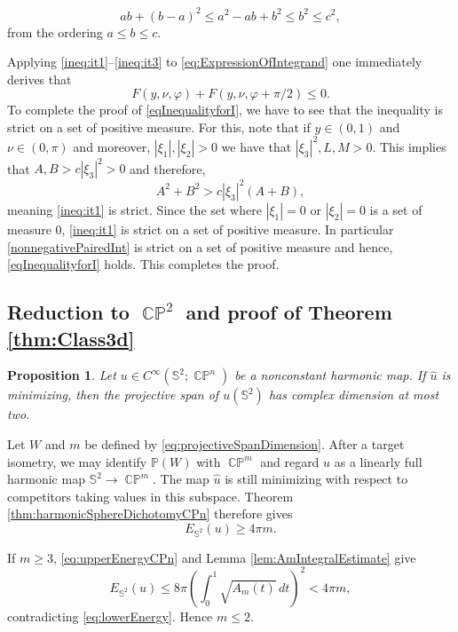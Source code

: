 \documentclass[11pt]{article}
\theoremstyle{plain}
\numberwithin{equation}{section}
\newtheorem{proposition}[theorem]{Proposition}
\theoremstyle{definition}
\let\oldendproof\endproof
\renewenvironment{proof}[1][\proofname]{%
\oldproof[\upshape \bfseries #1]%
}{\oldendproof}
\def \mb{\mathbb}
\DeclareMathOperator{\CP}{\mathbb{CP}}
\begin{document}
\begin{proof}
\begin{enumerate}
        \[
        ab+(b-a)^2\leq a^2-ab+b^2\leq b^2\leq c^2,
        \]
        from the ordering $a\leq b\leq c$.
    \end{enumerate}
    Applying \ref{ineq:it1}--\ref{ineq:it3} to \eqref{eq:ExpressionOfIntegrand} one immediately derives that
    \begin{equation}
        \label{nonnegativePairedInt}F(y,\nu,\varphi)+F(y,\nu,\varphi+\pi/2)\leq 0.
    \end{equation}
    To complete the proof of \eqref{eqInequalityforI}, we have to see that the inequality is strict on a set of positive measure. For this, note that if $y \in (0,1)$ and $\nu \in (0,\pi)$ and moreover, $|\xi_1|,|\xi_2|>0$ we have that $|\xi_3|^2,L,M>0$. This implies that $A,B>c|\xi_3|^2>0$ and therefore,
    \[
    A^2+B^2> c|\xi_3|^2(A+B),
    \]
    meaning \ref{ineq:it1} is strict. Since the set where $|\xi_1|=0$ or $|\xi_2|=0$ is a set of measure $0$, \ref{ineq:it1} is strict on a set of positive measure. In particular \eqref{nonnegativePairedInt} is strict on a set of positive measure and hence, \eqref{eqInequalityforI} holds. This completes the proof.
\end{proof}

\subsection{Reduction to \texorpdfstring{$\CP^2$}{CP2} and proof of
Theorem \ref{thm:Class3d}}

\begin{proposition}
    \label{prop:CP2Reduction}
Let $u\in C^\infty(\mb S^2;\CP^n)$ be a nonconstant harmonic map.  If
$\hat u$ is minimizing, then the projective span of $u(\mb S^2)$ has
complex dimension at most two.
\end{proposition}

\begin{proof}
Let $W$ and $m$ be defined by \eqref{eq:projectiveSpanDimension}.  
After a target isometry, we may identify $\mb P(W)$ with $\CP^m$ and regard
$u$ as a linearly full harmonic map $\mb S^2\to\CP^m$.  The map $\hat u$
is still minimizing with respect to competitors taking values in this
subspace.  Theorem \ref{thm:harmonicSphereDichotomyCPn} therefore gives
\begin{equation}
\label{eq:lowerEnergy}
E_{\mb S^2}(u)\geq 4\pi m.
\end{equation}

If $m\geq3$, \eqref{eq:upperEnergyCPn} and Lemma
\ref{lem:AmIntegralEstimate} give
\[
    E_{\mb S^2}(u)
    \leq8\pi\left(\int_0^1\sqrt{A_m(t)}\,dt\right)^2
    <4\pi m,
\]
contradicting \eqref{eq:lowerEnergy}.  Hence $m\leq2$.
\end{proof}
\end{document}

